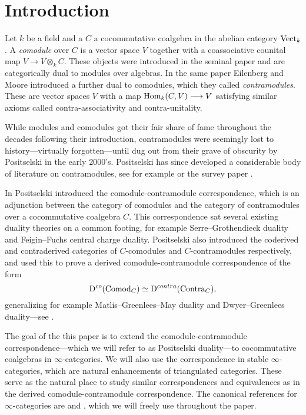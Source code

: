 
\section{Introduction}

Let $k$ be a field and a $C$ a cocommutative coalgebra in the abelian category $\mathrm{Vect}_k$. A \emph{comodule} over $C$ is a vector space $V$ together with a coassociative counital map $V\to V\otimes_k C$. These objects were introduced in the seminal paper \cite{eilenberg-moore_65} and are categorically dual to modules over algebras. In the same paper Eilenberg and Moore introduced a further dual to comodules, which they called \emph{contramodules}. These are vector spaces $V$ with a map $\operatorname{Hom}_k(C, V)\longrightarrow V$ satisfying similar axioms called contra-associativity and contra-unitality. 

While modules and comodules got their fair share of fame throughout the decades following their introduction, contramodules were seemingly lost to history---virtually forgotten---until dug out from their grave of obscurity by Positselski in the early 2000's. Positselski has since developed a considerable body of literature on contramodules, see for example \cite{positselski_2010, positselski_2011, positselski_2016, positselski_2017_contraadjusted, positselski_2020} or the survey paper \cite{positselski_2022_contramodules}. 

In \cite{positselski_2010} Positselski introduced the comodule-contramodule correspondence, which is an adjunction between the category of comodules and the category of contramodules over a cocommutative coalgebra $C$. This correspondence sat several existing duality theories on a common footing, for example Serre--Grothendieck duality and Feigin--Fuchs central charge duality. Positselski also introduced the coderived and contraderived categories of $C$-comodules and $C$-contramodules respectively, and used this to prove a derived comodule-contramodule correspondence of the form 
\[\mathrm{D}^{co}(\mathrm{Comod}_C)\simeq \mathrm{D}^{contra}(\mathrm{Contra}_C),\]
generalizing for example Matlis--Greenlees--May duality and Dwyer--Greenlees duality---see \cite{positselski_2016}. 

The goal of the this paper is to extend the comodule-contramodule correspondence---which we will refer to as Positselski duality---to cocommutative coalgebras in $\infty$-categories. We will also use the correspondence in stable $\infty$-categories, which are natural enhancements of triangulated categories. These serve as the natural place to study similar correspondences and equivalences as in the derived comodule-contramodule correspondence. The canonical references for $\infty$-categories are \cite{lurie_09} and \cite{Lurie_HA}, which we will freely use throughout the paper. 




